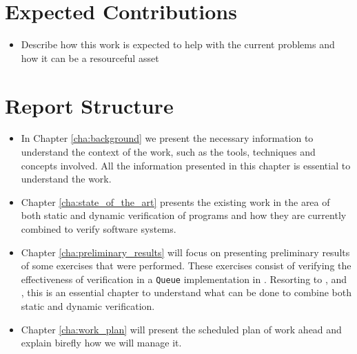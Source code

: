 \section{Expected Contributions}
\label{sec:expected_Contributions}

\begin{itemize}
    \item Describe how this work is expected to help with the current problems
    and how it can be a resourceful asset
\end{itemize}

\section{Report Structure}
\label{sec:report_structure}

\begin{itemize}
    \item In Chapter \ref{cha:background} we present the necessary information to understand
        the context of the work, such as the tools, techniques and concepts involved. All 
        the information presented in this chapter is essential to understand the work.
    \item Chapter \ref{cha:state_of_the_art} presents the existing work in the area of 
        both static and dynamic verification of \ocaml programs and how they are currently 
        combined to verify software systems.
    \item Chapter \ref{cha:preliminary_results} will focus on presenting preliminary 
        results of some exercises that were performed. These exercises consist of verifying 
        the effectiveness of verification in a \texttt{Queue} implementation in \ocaml. 
        Resorting to \gospellang, \cameleer and \ortac, this is an essential chapter to understand 
        what can be done to combine both static and dynamic verification.
    \item Chapter \ref{cha:work_plan} will present the scheduled plan of work ahead and explain 
    birefly how we will manage it.
\end{itemize}